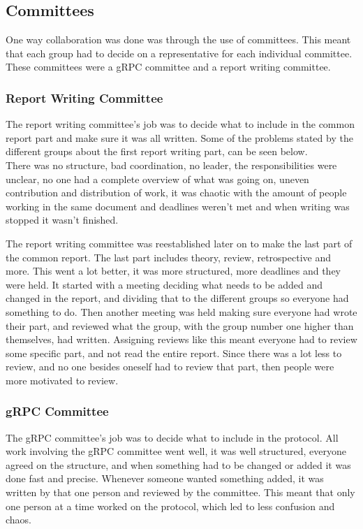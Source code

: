\subsection{Committees}
One way collaboration was done was through the use of committees.
This meant that each group had to decide on a representative for each individual committee. These committees were a gRPC committee and a report writing committee.


\subsubsection{Report Writing Committee}
The report writing committee's job was to decide what to include in the common report part and make sure it was all written.
Some of the problems stated by the different groups about the first report writing part, can be seen below.\\
There was no structure, bad coordination, no leader, the responsibilities were unclear, no one had a complete overview of what was going on, uneven contribution and distribution of work, it was chaotic with the amount of people working in the same document and deadlines weren't met and when writing was stopped it wasn't finished.


The report writing committee was reestablished later on to make the last part of the common report. The last part includes theory, review, retrospective and more.
This went a lot better, it was more structured, more deadlines and they were held. 
It started with a meeting deciding what needs to be added and changed in the report, and dividing that to the different groups so everyone had something to do.
Then another meeting was held making sure everyone had wrote their part, and reviewed what the group, with the group number one higher than themselves, had written.
Assigning reviews like this meant everyone had to review some specific part, and not read the entire report. 
Since there was a lot less to review, and no one besides oneself had to review that part, then people were more motivated to review.

\subsubsection{gRPC Committee}
The gRPC committee's job was to decide what to include in the protocol.
All work involving the gRPC committee went well, it was well structured, everyone agreed on the structure, and when something had to be changed or added it was done fast and precise.
Whenever someone wanted something added, it was written by that one person and reviewed by the committee.
This meant that only one person at a time worked on the protocol, which led to less confusion and chaos.
